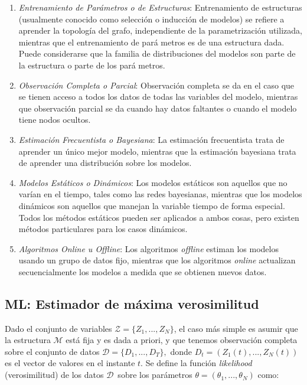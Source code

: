 \begin{enumerate}
	\item \emph{Entrenamiento de Parámetros o de Estructuras}: Entrenamiento	de estructuras (usualmente conocido como selección o inducción de modelos) se refiere a aprender la topología del grafo, independiente de la parametrización utilizada, mientras que el entrenamiento de pará metros es de una estructura dada. Puede considerarse que la familia de distribuciones del modelos son parte de la estructura o parte de los pará metros.
	
	\item \emph{Observación Completa o Parcial}: Observación completa se da en el caso que se tienen acceso a todos los datos de todas las variables	del modelo, mientras que observación parcial se da cuando hay datos faltantes o cuando el modelo tiene nodos ocultos.
	
	\item \emph{Estimación Frecuentista o Bayesiana}: La estimación 	frecuentista trata de aprender un único mejor modelo, mientras que la estimación bayesiana trata de aprender una distribución sobre los
	modelos.
	
	\item \emph{Modelos Estáticos o Dinámicos}: Los modelos estáticos son aquellos que no varían en el tiempo, tales como las redes bayesianas, mientras que los modelos dinámicos son aquellos que manejan la variable tiempo de forma especial. Todos los métodos estáticos
	pueden ser aplicados a ambos cosas, pero existen métodos particulares para los casos dinámicos.
	
	\item \emph{Algoritmos Online u Offline}: Los algoritmos \emph{offline} estiman los modelos usando un grupo de datos fijo, mientras que los algoritmos \emph{online} actualizan secuencialmente los modelos a medida que se obtienen nuevos datos.
\end{enumerate}





\subsection{ML: Estimador de máxima verosimilitud}

Dado el conjunto de variables $\mathcal{Z}=\{Z_{1},...,Z_{N}\}$, el caso más simple es asumir que la estructura $\mathcal{M}$ está fija y es dada a priori, y que tenemos observación completa sobre el conjunto de datos $\mathcal{D}=\{D_{1},...,D_{T}\},$ donde $D_{t}=(Z_{1}(t),...,Z_{N}(t)) $ es el vector de valores en el instante $t$. Se define la función \emph{likelihood} (verosimilitud) de los datos $\mathcal{D}$\ sobre los parámetros $\theta =(\theta _{1},...,\theta_{N}) $ como:

